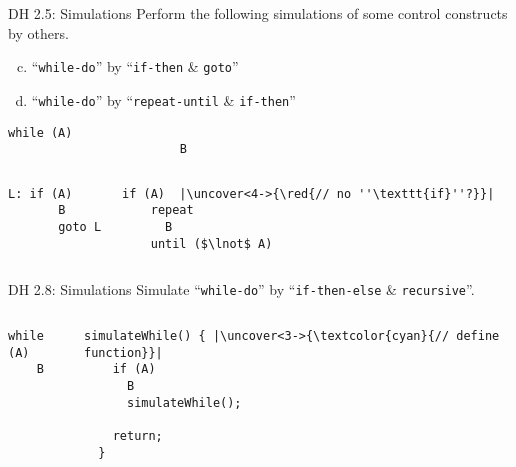 \begin{frame}[fragile]{}
  \begin{exampleblock}{DH 2.5: Simulations}
    Perform the following simulations of some control constructs by others.
    \begin{enumerate}[(a)]
      \setcounter{enumi}{(2)}
      \item ``\texttt{while-do}'' by ``\texttt{if-then} \& \texttt{goto}''
      \item ``\texttt{while-do}'' by ``\texttt{repeat-until} \& \texttt{if-then}''
    \end{enumerate}
  \end{exampleblock}

  \begin{lstlisting}[style = Cstyle, backgroundcolor = \color{teal!10!lightgray}]
                      while (A)
                        B
  \end{lstlisting}

  \begin{columns}
      \pause
      \begin{lstlisting}[style = Cstyle]
  L: if (A)
       B
       goto L
      \end{lstlisting}
      \pause
      \begin{lstlisting}[style = Cstyle]
  if (A)  |\uncover<4->{\red{// no ''\texttt{if}''?}}|
    repeat
      B
    until ($\lnot$ A)
      \end{lstlisting}
  \end{columns}
\end{frame}

\begin{frame}[fragile]{}
  \begin{exampleblock}{DH 2.8: Simulations}
    Simulate ``\texttt{while-do}'' by ``\texttt{if-then-else} \& \texttt{recursive}''.
  \end{exampleblock}

  \begin{columns}
      \begin{lstlisting}[style = Cstyle, backgroundcolor = \color{teal!10!lightgray}]
  while (A)
    B
      \end{lstlisting}
      \pause
      \begin{lstlisting}[style = Cstyle]
  simulateWhile() { |\uncover<3->{\textcolor{cyan}{// define function}}|
    if (A)
      B
      simulateWhile();

    return;
  }
      \end{lstlisting}
  \end{columns}

\end{frame}

